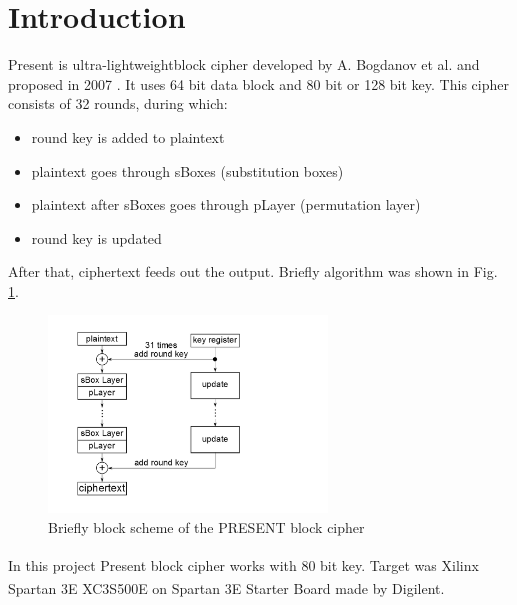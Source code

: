 \documentclass{gajewski}
\begin{document}
\maketitle

\newpage

\revisionTable

\newpage

\tableofcontents
\newpage

\section{Introduction}

Present is \textgravedbl ultra-lightweight\textacutedbl \space block cipher developed by A. Bogdanov et al. and proposed in 2007 \cite{PRESENT}. It uses 64 bit data block and 80 bit or 128 bit key.
This cipher consists of 32 rounds, during which: 
\begin{itemize}
    \item round key is added to plaintext
    \item plaintext goes through sBoxes (substitution boxes)
    \item plaintext after sBoxes goes through pLayer (permutation layer)
    \item round key is updated
\end{itemize}
After that, ciphertext feeds out the output. Briefly algorithm was shown in Fig. \ref{pAlgorithm}.
\begin{figure}[!ht]%
    \begin{center}
    \includegraphics[width=0.66\textwidth]{img/presentAlgorithm.png}
    \caption{%
        Briefly block scheme of the PRESENT block cipher
     }%
    \label{pAlgorithm}
    \end{center}
 \end{figure}
In this project Present block cipher works with 80 bit key. Target was Xilinx\textsuperscript{\textregistered} Spartan 3E XC3S500E \cite{Spartan} on Spartan 3E  Starter Board \cite{Digilent} made by Digilent\textsuperscript{\textregistered}.
\end{document}
